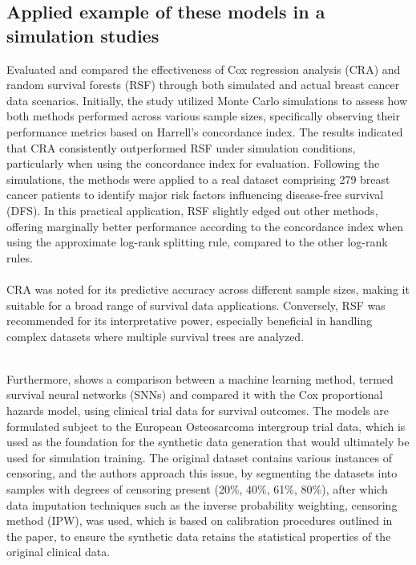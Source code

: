 \subsection{Applied example of these models in a simulation studies}

\noindent \parencite{kurt_omurlu_comparisons_2009} Evaluated and compared the effectiveness of Cox regression analysis (CRA) and random survival forests (RSF) through both simulated and actual breast cancer data scenarios. Initially, the study utilized Monte Carlo simulations to assess how both methods performed across various sample sizes, specifically observing their performance metrics based on Harrell's concordance index. The results indicated that CRA consistently outperformed RSF under simulation conditions, particularly when using the concordance index for evaluation. Following the simulations, the methods were applied to a real dataset comprising 279 breast cancer patients to identify major risk factors influencing disease-free survival (DFS). In this practical application, RSF slightly edged out other methods, offering marginally better performance according to the concordance index when using the approximate log-rank splitting rule, compared to the other log-rank rules.
\\\\
\noindent \parencite{kurt_omurlu_comparisons_2009} CRA was noted for its predictive accuracy across different sample sizes, making it suitable for a broad range of survival data applications. Conversely, RSF was recommended for its interpretative power, especially beneficial in handling complex datasets where multiple survival trees are analyzed.
\\\\
\par \noindent Furthermore, \parencite{kantidakis_simulation_2021} shows a comparison between a machine learning method, termed survival neural networks (SNNs) and compared it with the Cox proportional hazards model, using clinical trial data for survival outcomes. The models are formulated subject to the European Osteosarcoma intergroup trial data, which is used as the foundation for the synthetic data generation that would ultimately be used for simulation training. The original dataset contains various instances of censoring, and the authors approach this issue, by segmenting the datasets into samples with degrees of censoring present (20\%, 40\%, 61\%, 80\%), after which data imputation techniques such as the inverse probability weighting, censoring method (IPW), was used, which is based on calibration procedures outlined in the paper, to ensure the synthetic data retains the statistical properties of the original clinical data. 
